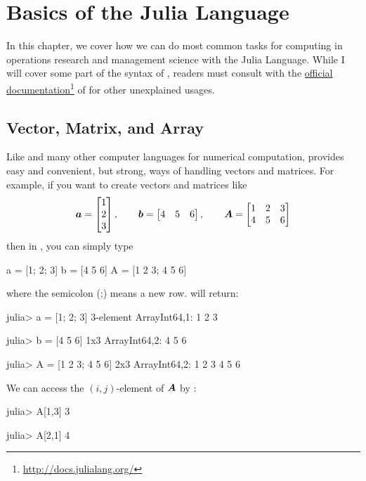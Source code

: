\chapter{Basics of the Julia Language}

In this chapter, we cover how we can do most common tasks for computing in operations research and management science with the Julia Language. While I will cover some part of the syntax of \julia{}, readers must consult with the \href{http://docs.julialang.org/}{official documentation}\footnote{\url{http://docs.julialang.org/}} of \julia{} for other unexplained usages.


\section{Vector, Matrix, and Array}

Like \matlab{} and many other computer languages for numerical computation, \julia{} provides easy and convenient, but strong, ways of handling vectors and matrices. For example, if you want to create vectors and matrices like
\[
\boldsymbol{a} = \begin{bmatrix} 1\\2\\3 \end{bmatrix}, \qquad \boldsymbol{b} = \begin{bmatrix} 4 & 5 & 6 \end{bmatrix}, \qquad \boldsymbol{A} = \begin{bmatrix} 1 & 2 & 3 \\ 4 & 5 & 6 \end{bmatrix}
\]
then in \julia{}, you can simply type
\begin{code}
a = [1; 2; 3]
b = [4 5 6]
A = [1 2 3; 4 5 6]
\end{code}
\noindent where the semicolon (;) means a new row. \julia{} will return:
\begin{code}
julia> a = [1; 2; 3]
3-element Array{Int64,1}:
 1
 2
 3

julia> b = [4 5 6]
1x3 Array{Int64,2}:
 4  5  6

julia> A = [1 2 3; 4 5 6]
2x3 Array{Int64,2}:
 1  2  3
 4  5  6
\end{code}
\noindent We can access the $(i,j)$-element of $\boldsymbol{A}$ by :
\begin{code}
julia> A[1,3]
3

julia> A[2,1]
4
\end{code}




